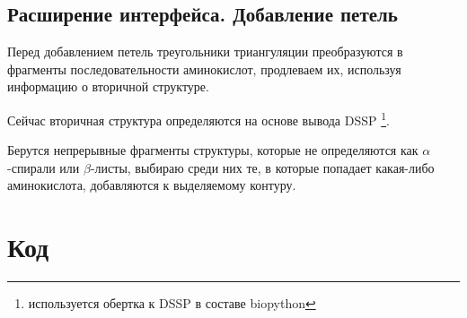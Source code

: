 \subsection{Расширение интерфейса. Добавление петель}

Перед добавлением петель треугольники триангуляции преобразуются в фрагменты последовательности аминокислот, продлеваем их, используя информацию о вторичной структуре.



Сейчас вторичная структура определяются на основе вывода DSSP \footnote{используется обертка к DSSP в составе biopython}.

Берутся непрерывные фрагменты структуры, которые не определяются как $\alpha$-спирали или $\beta$-листы, выбираю среди них те, в которые попадает какая-либо аминокислота, добавляются к выделяемому контуру.











\section{Код}
